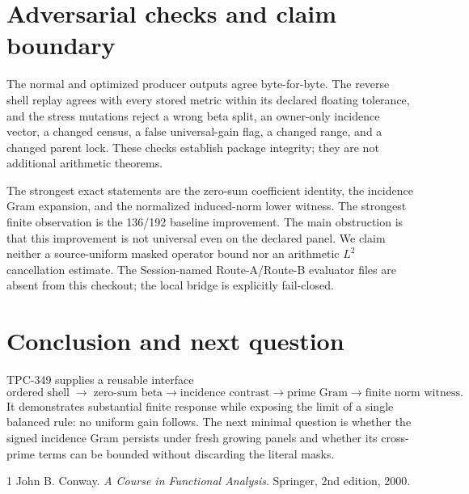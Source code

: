 \documentclass[10pt]{article}
\begin{document}
\section{Adversarial checks and claim boundary}

The normal and optimized producer outputs agree byte-for-byte.  The reverse
shell replay agrees with every stored metric within its declared floating
tolerance, and the stress mutations reject a wrong beta split, an owner-only
incidence vector, a changed census, a false universal-gain flag, a changed
range, and a changed parent lock.  These checks establish package integrity;
they are not additional arithmetic theorems.

The strongest exact statements are the zero-sum coefficient identity, the
incidence Gram expansion, and the normalized induced-norm lower witness.  The
strongest finite observation is the 136/192 baseline improvement.  The main
obstruction is that this improvement is not universal even on the declared
panel.  We claim neither a source-uniform masked operator bound nor an
arithmetic $L^2$ cancellation estimate.  The Session-named Route-A/Route-B
evaluator files are absent from this checkout; the local bridge is explicitly
fail-closed.

\section{Conclusion and next question}

TPC-349 supplies a reusable interface
\[
 \text{ordered shell}\;\longrightarrow\;\text{zero-sum beta}
 \longrightarrow\text{incidence contrast}\longrightarrow\text{prime Gram}
 \longrightarrow\text{finite norm witness}.
\]
It demonstrates substantial finite response while exposing the limit of a
single balanced rule: no uniform gain follows.  The next minimal question is
whether the signed incidence Gram persists under fresh growing panels and
whether its cross-prime terms can be bounded without discarding the literal
masks.

\begin{thebibliography}{1}
John B. Conway. \emph{A Course in Functional Analysis}. Springer, 2nd edition,
2000.
\end{thebibliography}
\end{document}
